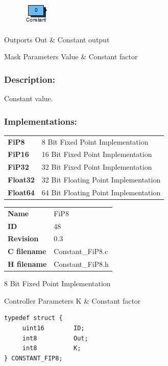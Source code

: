 \label{block:Constant}
\begin{figure}[H]\includegraphics{Constant}\end{figure} 

\begin{XtoCtabular}{Outports}
Out & Constant output\tabularnewline
\hline
\end{XtoCtabular}

\begin{XtoCtabular}{Mask Parameters}
Value & Constant factor\tabularnewline
\hline
\end{XtoCtabular}

\subsubsection*{Description:}
Constant value.

\subsubsection*{Implementations:}
\begin{tabular}{l l}
\textbf{FiP8} & 8 Bit Fixed Point Implementation\tabularnewline
\textbf{FiP16} & 16 Bit Fixed Point Implementation\tabularnewline
\textbf{FiP32} & 32 Bit Fixed Point Implementation\tabularnewline
\textbf{Float32} & 32 Bit Floating Point Implementation\tabularnewline
\textbf{Float64} & 64 Bit Floating Point Implementation\tabularnewline
\end{tabular}

\nopagebreak[0]
\begin{tabular}{l l}
\textbf{Name} & FiP8 \tabularnewline
\textbf{ID} & 48 \tabularnewline
\textbf{Revision} & 0.3 \tabularnewline
\textbf{C filename} & Constant\_FiP8.c \tabularnewline
\textbf{H filename} & Constant\_FiP8.h \tabularnewline
\end{tabular}
\vspace{1ex}

8 Bit Fixed Point Implementation

\begin{XtoCtabular}{Controller Parameters}
K & Constant factor\tabularnewline
\hline
\end{XtoCtabular}

\begin{lstlisting}
typedef struct {
     uint16        ID;
     int8          Out;
     int8          K;
} CONSTANT_FIP8;
\end{lstlisting}

